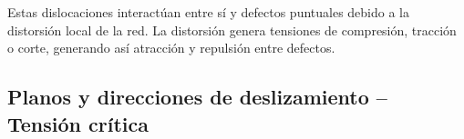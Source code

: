Estas dislocaciones interactúan entre sí y defectos puntuales debido a la distorsión local de la red. La distorsión genera tensiones de compresión, tracción o corte, generando así atracción y repulsión entre defectos.

\subsection[Planos y direcciones de deslizamiento]{Planos y direcciones de deslizamiento -- Tensión crítica }



